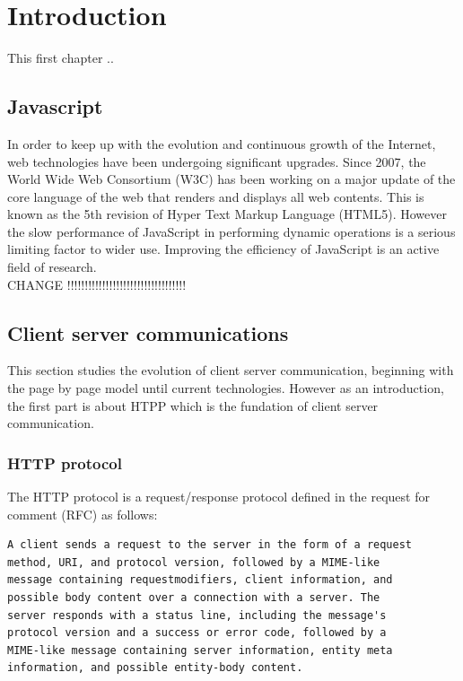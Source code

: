 \chapter{Introduction}
\label{Chapter1}

This first chapter ..\\

\section{Javascript}

In order to keep up with the evolution and continuous growth of the Internet,
web technologies have been undergoing significant upgrades. Since 2007, the
World Wide Web Consortium (W3C) has been working on a major update of the core
language of the web that renders and displays all web contents. This is known
as the 5th revision of Hyper Text Markup Language (HTML5).  However the slow
performance of JavaScript in performing dynamic operations is a serious
limiting factor to wider use. Improving the efficiency of JavaScript is an
active field of research.\\


CHANGE !!!!!!!!!!!!!!!!!!!!!!!!!!!!!!!!!!

\section{Client server communications}

This section studies the evolution of client server communication, beginning
with the page by page model until current technologies. However as an
introduction, the first part is about HTPP which is the fundation of client
server communication.

\subsection{HTTP protocol}

The HTTP protocol is a request/response protocol defined in the request for
comment (RFC) \cite{Reference1} as follows:

\begin{verbatim} 
A client sends a request to the server in the form of a request 
method, URI, and protocol version, followed by a MIME-like 
message containing requestmodifiers, client information, and 
possible body content over a connection with a server. The 
server responds with a status line, including the message's
protocol version and a success or error code, followed by a 
MIME-like message containing server information, entity meta 
information, and possible entity-body content.  
\end{verbatim}

